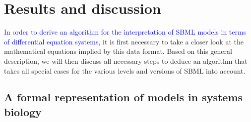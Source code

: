 \documentclass[10pt]{bmc_article}
\newenvironment{bmcformat}{\fussy\setboolean{publ}{true}}{\fussy}
\newcommand{\COR}[1]{\textcolor{blue}{#1}}
\begin{document}
\begin{bmcformat}
\section*{Results and discussion}

\COR{In order to derive an algorithm for the interpretation of \acs{SBML} models in terms of differential equation systems}, it is
first necessary to take a closer look at the mathematical equations implied by
this data format.
Based on this general description, we will then discuss all necessary steps
to deduce an algorithm that takes all special cases for the various levels and
versions of \acs{SBML} into account.

\subsection*{A formal representation of models in systems biology}


\end{bmcformat}
\end{document}
